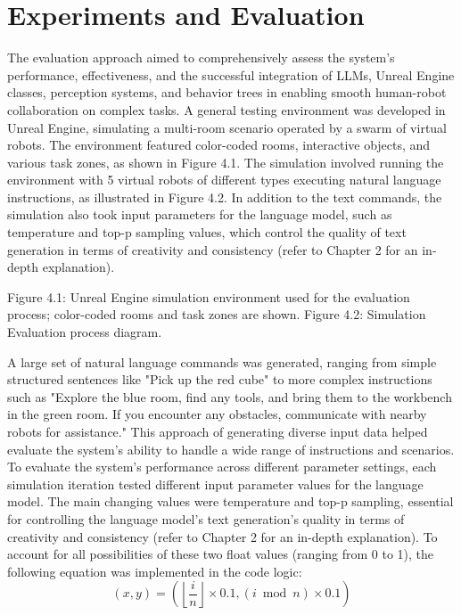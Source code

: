 \documentclass[pdflatex,sn-mathphys-num]{sn-jnl}%
\theoremstyle{thmstyleone}%
\theoremstyle{thmstyletwo}%
\theoremstyle{thmstylethree}%
\begin{document}
\section{Experiments and Evaluation}
The evaluation approach aimed to comprehensively assess the system's performance, effectiveness, and the successful integration of LLMs, Unreal Engine classes, perception systems, and behavior trees in enabling smooth human-robot collaboration on complex tasks. A general testing environment was developed in Unreal Engine, simulating a multi-room scenario operated by a swarm of virtual robots. The environment featured color-coded rooms, interactive objects, and various task zones, as shown in Figure 4.1.
The simulation involved running the environment with 5 virtual robots of different types executing natural language instructions, as illustrated in Figure 4.2. In addition to the text commands, the simulation also took input parameters for the language model, such as temperature and top-p sampling values, which control the quality of text generation in terms of creativity and consistency (refer to Chapter 2 for an in-depth explanation).

Figure 4.1: Unreal Engine simulation environment used for the evaluation process; color-coded rooms and task zones are shown.
Figure 4.2: Simulation Evaluation process diagram.


A large set of natural language commands was generated, ranging from simple structured sentences like "Pick up the red cube" to more complex instructions such as "Explore the blue room, find any tools, and bring them to the workbench in the green room. If you encounter any obstacles, communicate with nearby robots for assistance." This approach of generating diverse input data helped evaluate the system's ability to handle a wide range of instructions and scenarios.
To evaluate the system's performance across different parameter settings, each simulation iteration tested different input parameter values for the language model. The main changing values were temperature and top-p sampling, essential for controlling the language model's text generation's quality in terms of creativity and consistency (refer to Chapter 2 for an in-depth explanation).
To account for all possibilities of these two float values (ranging from 0 to 1), the following equation was implemented in the code logic:
\begin{equation}
(x, y) = \left(\left\lfloor\frac{i}{n}\right\rfloor \times 0.1, (i \bmod n) \times 0.1\right)
\end{equation}
\end{document}
